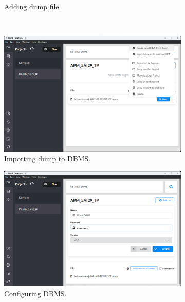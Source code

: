 \begin{figure}
\begin{subfigure}[b]{0.49\textwidth}
        \caption{Adding dump file.}
    \end{subfigure}
    \\
    \begin{subfigure}[b]{0.49\textwidth}
        \centering
        \includegraphics[width=\textwidth]{images/neo4j-setup/3}
        \caption{Importing dump to DBMS.}
    \end{subfigure}
    \hfill
    \begin{subfigure}[b]{0.49\textwidth}
        \centering
        \includegraphics[width=\textwidth]{images/neo4j-setup/4}
        \caption{Configuring DBMS.}
    \end{subfigure}
    \\
    \begin{subfigure}[b]{0.49\textwidth}
        \centering

\end{subfigure}
\end{figure}

